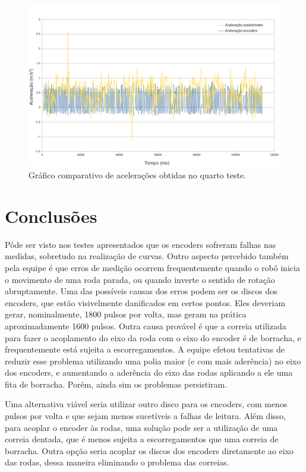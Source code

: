 \begin{figure}[H]
	\centering
	\includegraphics[width=1\textwidth]{./figuras/testes/teste4/grafico_acel.png}
	\caption{Gráfico comparativo de acelerações obtidas no quarto teste.}
	\label{fig:teste4_acel_grafico}
\end{figure}

\chapter{Conclusões}

Pôde ser visto nos testes apresentados que os encoders sofreram falhas nas medidas, sobretudo na realização de curvas. Outro aspecto percebido também pela equipe é que erros de medição ocorrem frequentemente quando o robô inicia o movimento de uma roda parada, ou quando inverte o sentido de rotação abruptamente. Uma das possíveis causas dos erros podem ser os discos dos encoders, que estão visivelmente danificados em certos pontos. Eles deveriam gerar, nominalmente, 1800 pulsos por volta, mas geram na prática aproximadamente 1600 pulsos.
Outra causa provável é que a correia utilizada para fazer o acoplamento do eixo da roda com o eixo do encoder é de borracha, e frequentemente está sujeita a escorregamentos. A equipe efetou tentativas de reduzir esse problema utilizando uma polia maior (e com mais aderência) no eixo dos encoders, e aumentando a aderência do eixo das rodas aplicando a ele uma fita de borracha. Porém, ainda sim os problemas persistiram. 

Uma alternativa viável seria utilizar outro disco para os encoders, com menos pulsos por volta e que sejam menos sucetíveis a falhas de leitura. Além disso, para acoplar o encoder às rodas, uma solução pode ser a utilização de uma correia dentada, que é menos sujeita a escorregamentos que uma correia de borracha. Outra opção seria acoplar os discos dos encoders diretamente ao eixo das rodas, dessa maneira eliminando o problema das correias.

